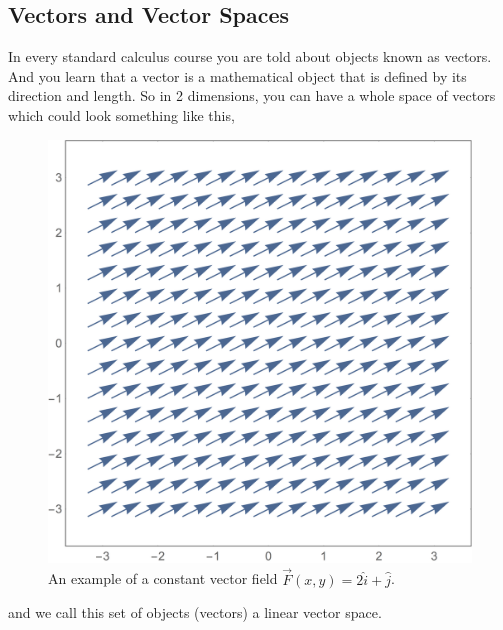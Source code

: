 \documentclass{article}
\begin{document}
\subsection*{Vectors and Vector Spaces}
In every standard calculus course you are told about objects known as vectors.
And you learn that a vector is a mathematical object that is defined by its direction and length.
So in 2 dimensions, you can have a whole space of vectors which could look something like this,
\begin{figure}[H]
  \centering
  \includegraphics[scale=0.7]{Figures/vectors.png}
    \caption{An example of a constant vector field $\vec{F}(x,y) = 2 \hat{i} + \hat{j}$.}
  \label{fig:rotation}
\end{figure}
\noindent
and we call this set of objects (vectors) a linear vector space.
\end{document}

